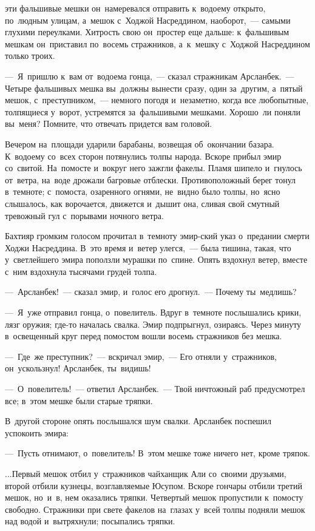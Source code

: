 \documentclass[12pt,a4paper]{book}
\begin{document}
эти фальшивые мешки он~намеревался отправить к~водоему открыто, по~людным улицам, а~мешок с~Ходжой Насреддином, наоборот,~— самыми глухими переулками. Хитрость свою он~простер еще дальше: к~фальшивым мешкам он~приставил по~восемь стражников, а~к~мешку с~Ходжой Насреддином только троих.

—~Я~пришлю к~вам от~водоема гонца,~— сказал стражникам Арсланбек.~— Четыре фальшивых мешка вы~должны вынести сразу, один за~другим, а~пятый мешок, с~преступником,~— немного погодя и~незаметно, когда все любопытные, толпящиеся у~ворот, устремятся за~фальшивыми мешками. Хорошо~ли поняли вы~меня? Помните, что отвечать придется вам головой.

Вечером на~площади ударили барабаны, возвещая об~окончании базара. К~водоему со~всех сторон потянулись толпы народа. Вскоре прибыл эмир со~свитой. На~помосте и~вокруг него зажгли факелы. Пламя шипело и~гнулось от~ветра, на~воде дрожали багровые отблески. Противоположный берег тонул в~темноте; с~помоста, озаренного огнями, не~видно было толпы, но~ясно слышалось, как ворочается, движется и~дышит она, сливая свой смутный тревожный гул с~порывами ночного ветра.

Бахтияр громким голосом прочитал в~темноту эмир-ский указ о~предании смерти Ходжи Насреддина. В~это время и~ветер улегся,~— была тишина, такая, что у~светлейшего эмира поползли мурашки по~спине. Опять вздохнул ветер, вместе с~ним вздохнула тысячами грудей толпа.

—~Арсланбек!~— сказал эмир, и~голос его дрогнул.~— Почему ты~медлишь?

—~Я~уже отправил гонца, о~повелитель. Вдруг в~темноте послышались крики, лязг оружия; где-то началась свалка. Эмир подпрыгнул, озираясь. Через минуту в~освещенный круг перед помостом вошли восемь стражников без мешка.

—~Где~же преступник?~— вскричал эмир,~— Его отняли у~стражников, он~ускользнул! Арсланбек, ты~видишь!

—~О~повелитель!~— ответил Арсланбек.~— Твой ничтожный раб предусмотрел все; в~этом мешке были старые тряпки.

В~другой стороне опять послышался шум свалки. Арсланбек поспешил успокоить эмира:

—~Пусть отнимают, о~повелитель! В~этом мешке тоже ничего нет, кроме тряпок.

...Первый мешок отбил у~стражников чайханщик Али со~своими друзьями, второй отбили кузнецы, возглавляемые Юсупом. Вскоре гончары отбили третий мешок, но~и~в, нем оказались тряпки. Четвертый мешок пропустили к~помосту свободно. Стражники при свете факелов на~глазах у~всей толпы подняли мешок над водой и~вытряхнули; посыпались тряпки.
\end{document}
